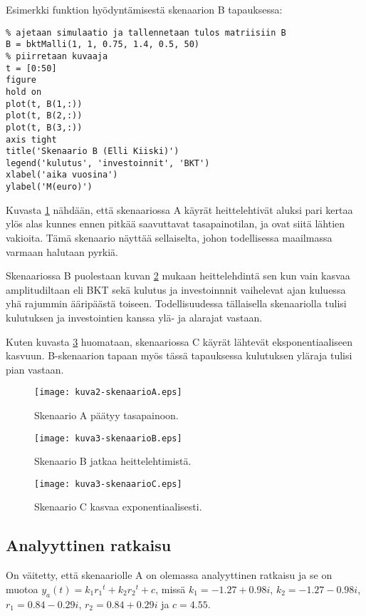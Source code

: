 \documentclass[a4paper,11pt]{article}
\begin{document}
{Esimerkki funktion hyödyntämisestä skenaarion B tapauksessa:

\begin{lstlisting}
% ajetaan simulaatio ja tallennetaan tulos matriisiin B
B = bktMalli(1, 1, 0.75, 1.4, 0.5, 50)
% piirretaan kuvaaja
t = [0:50]
figure
hold on
plot(t, B(1,:))
plot(t, B(2,:))
plot(t, B(3,:))
axis tight
title('Skenaario B (Elli Kiiski)')
legend('kulutus', 'investoinnit', 'BKT')
xlabel('aika vuosina')
ylabel('M(euro)')
\end{lstlisting}

Kuvasta \ref{sA} nähdään, että skenaariossa A käyrät heittelehtivät aluksi pari kertaa ylös alas kunnes ennen pitkää saavuttavat tasapainotilan, ja ovat siitä lähtien vakioita. Tämä skenaario näyttää sellaiselta, johon todellisessa maailmassa varmaan halutaan pyrkiä.

Skenaariossa B puolestaan kuvan \ref{sB} mukaan heittelehdintä sen kun vain kasvaa amplitudiltaan eli BKT sekä kulutus ja investoinnnit vaihelevat ajan kuluessa yhä rajummin ääripäästä toiseen. Todellisuudessa tällaisella skenaariolla tulisi kulutuksen ja investointien kanssa ylä- ja alarajat vastaan.

Kuten kuvasta \ref{sC} huomataan, skenaariossa C käyrät lähtevät eksponentiaaliseen kasvuun. B-skenaarion tapaan myös tässä tapauksessa kulutuksen yläraja tulisi pian vastaan.

\begin{figure}
    \centering
    \texttt{[image: kuva2-skenaarioA.eps]}
    \caption{Skenaario A päätyy tasapainoon.}
    \label{sA}
\end{figure}

\begin{figure}
    \centering
    \texttt{[image: kuva3-skenaarioB.eps]}
    \caption{Skenaario B jatkaa heittelehtimistä.}
    \label{sB}
\end{figure}

\begin{figure}
    \centering
    \texttt{[image: kuva3-skenaarioC.eps]}
    \caption{Skenaario C kasvaa exponentiaalisesti.}
    \label{sC}
\end{figure}

\subsection{Analyyttinen ratkaisu}

On väitetty, että skenaariolle A on olemassa analyyttinen ratkaisu ja se on muotoa $y_a(t)=k_1{r_1}^t+k_2{r_2}^t+c$, missä $k_1 = -1.27 + 0.98i$, $k_2 = -1.27 - 0.98i$, $r_1 = 0.84 - 0.29i$, $r_2 = 0.84 + 0.29i$ ja $c = 4.55$.

}
\end{document}
